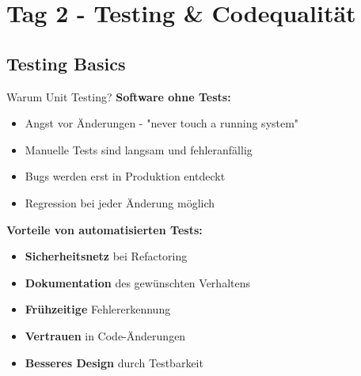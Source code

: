 \section{Tag 2 - Testing \& Codequalität}


\subsection{Testing Basics}

\begin{frame}{Warum Unit Testing?}
  \textbf{Software ohne Tests:}
  \begin{itemize}
    \item Angst vor Änderungen - "never touch a running system"
    \item Manuelle Tests sind langsam und fehleranfällig
    \item Bugs werden erst in Produktion entdeckt
    \item Regression bei jeder Änderung möglich
  \end{itemize}

  \textbf{Vorteile von automatisierten Tests:}
  \begin{itemize}
    \item \textbf{Sicherheitsnetz} bei Refactoring
    \item \textbf{Dokumentation} des gewünschten Verhaltens
    \item \textbf{Frühzeitige} Fehlererkennung
    \item \textbf{Vertrauen} in Code-Änderungen
    \item \textbf{Besseres Design} durch Testbarkeit
  \end{itemize}
\end{frame}

